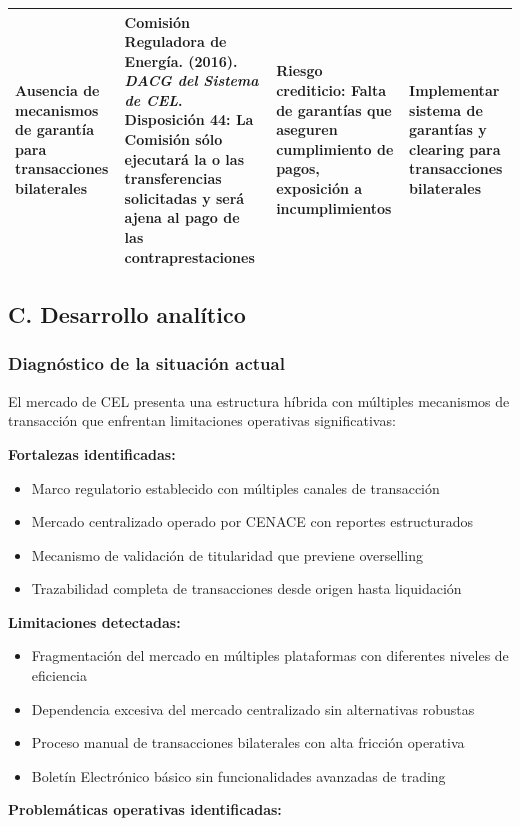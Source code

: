 \documentclass{cel}
\begin{document}
\begin{tabladoradoLargo}
\begin{xltabular}{\textwidth}{|X|X|X|X|}
Ausencia de mecanismos de garantía para transacciones bilaterales & Comisión Reguladora de Energía. (2016). \textit{DACG del Sistema de CEL}. Disposición 44: \textquotedbl{}La Comisión sólo ejecutará la o las transferencias solicitadas y será ajena al pago de las contraprestaciones\textquotedbl{} & Riesgo crediticio: Falta de garantías que aseguren cumplimiento de pagos, exposición a incumplimientos & Implementar sistema de garantías y clearing para transacciones bilaterales \\ \hline
\bottomrule
\end{xltabular}
\end{tabladoradoLargo}

\subsection{C. Desarrollo analítico}
\nopagebreak

\subsubsection{Diagnóstico de la situación actual}
\nopagebreak

El mercado de CEL presenta una estructura híbrida con múltiples mecanismos de transacción que enfrentan limitaciones operativas significativas:


\textbf{Fortalezas identificadas:}


\begin{itemize}
\item Marco regulatorio establecido con múltiples canales de transacción
\item Mercado centralizado operado por CENACE con reportes estructurados
\item Mecanismo de validación de titularidad que previene overselling
\item Trazabilidad completa de transacciones desde origen hasta liquidación

\end{itemize}
\textbf{Limitaciones detectadas:}


\begin{itemize}
\item Fragmentación del mercado en múltiples plataformas con diferentes niveles de eficiencia
\item Dependencia excesiva del mercado centralizado sin alternativas robustas
\item Proceso manual de transacciones bilaterales con alta fricción operativa
\item Boletín Electrónico básico sin funcionalidades avanzadas de trading

\end{itemize}
\textbf{Problemáticas operativas identificadas:}
\end{document}
